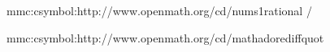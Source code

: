 

\unprotect


\startsetups mmc:csymbol:http://www.openmath.org/cd/nums1 rational
    \MMLcreset
    \getXMLstackdata\plustwo/\getXMLstackdata\plusthree
\stopsetups


\startsetups mmc:csymbol:http://www.openmath.org/cd/mathadore diffquot
    \MMLcreset
    \frac {
        \Delta\getXMLstackdata\plustwo
    } {
        \Delta\getXMLstackdata\plusthree
    }
\stopsetups


